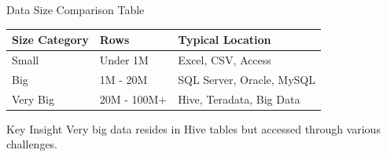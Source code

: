 \documentclass{beamer}
\begin{document}
	\begin{frame}{Data Size Comparison Table}
		\begin{table}
			\small
			\begin{tabular}{|l|l|l|}
				\hline
				\textbf{Size Category} & \textbf{Rows} & \textbf{Typical Location} \\
				\hline
				Small & Under 1M & Excel, CSV, Access \\
				\hline
				Big & 1M - 20M & SQL Server, Oracle, MySQL \\
				\hline
				Very Big & 20M - 100M+ & Hive, Teradata, Big Data \\
				\hline
			\end{tabular}
		\end{table}
		\begin{alertblock}{Key Insight}
			Very big data resides in Hive tables but accessed through various challenges.
		\end{alertblock}
	\end{frame}
	
\end{document}
